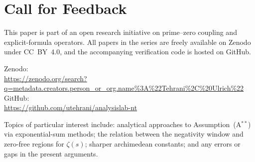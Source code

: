 \documentclass[11pt]{article}
\begin{document}
\section*{Call for Feedback}

This paper is part of an open research initiative on prime--zero
coupling and explicit-formula operators.
All papers in the series are freely available on Zenodo under CC~BY~4.0, and
the accompanying verification code is hosted on GitHub.

{\raggedright
Zenodo:\\
\url{https://zenodo.org/search?q=metadata.creators.person_or_org.name\%3A\%22Tehrani\%2C\%20Ulrich\%22}\\
GitHub:\\
\url{https://github.com/utehrani/analysislab-nt}
\par}

Topics of particular interest include:
analytical approaches to Assumption~(A$^{**}$) via exponential-sum methods;
the relation between the negativity window and zero-free regions for
$\zeta(s)$; sharper archimedean constants; and any errors or gaps in the
present arguments.
\end{document}
